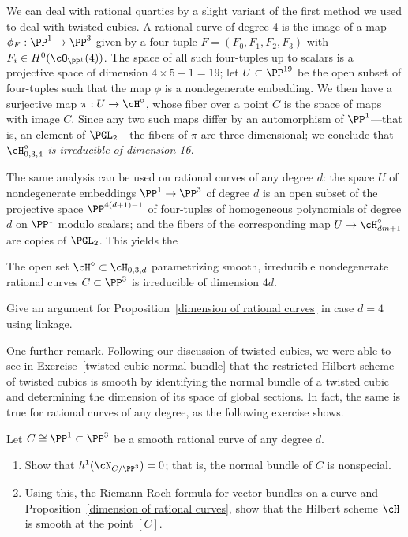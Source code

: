 We can deal with rational quartics by a slight variant of the first method we used to deal with twisted cubics. A rational curve of degree 4 is the image of a map $\phi_F : \PP^1 \to \PP^3$ given by a four-tuple $F = (F_0,F_1,F_2,F_3)$ with $F_i \in H^0(\cO_{\PP^1}(4))$. The space of all such four-tuples up to scalars is a projective space of dimension $4 \times 5 - 1 = 19$; let $U \subset \PP^{19}$ be the open subset of four-tuples such that the map $\phi$ is a nondegenerate embedding. We then have a surjective map $\pi : U \to \cH^\circ$, whose fiber over a point $C$ is the space of maps with image $C$. Since any two such maps differ by an automorphism of $\PP^1$---that is, an element of $\PGL_2$---the fibers of $\pi$ are three-dimensional; we conclude that \emph{$\cH^\circ_{0,3,4}$ is irreducible of dimension 16}.

The same analysis can be used on rational curves of any degree $d$: the space $U$ of nondegenerate embeddings $\PP^1 \to \PP^3$ of degree $d$ is an open subset of the projective space $\PP^{4(d+1)-1}$ of four-tuples of homogeneous polynomials of degree $d$ on $\PP^1$ modulo scalars; and the fibers of the corresponding map $U \to \cH^\circ_{dm+1}$ are copies of $\PGL_2$. This yields the

\begin{proposition}\label{dimension of rational curves}
The open set $\cH^\circ \subset \cH_{0,3,d}$ parametrizing smooth, irreducible nondegenerate rational curves $C \subset \PP^3$ is irreducible of dimension $4d$.
\end{proposition}

\begin{exercise}
Give an argument for Proposition~\ref{dimension of rational curves} in case $d=4$ using linkage. 
\end{exercise}

One further remark. Following our discussion of twisted cubics, we were able to see in Exercise~\ref{twisted cubic normal bundle} that the restricted Hilbert scheme of twisted cubics is smooth by identifying the normal bundle of a twisted cubic and determining the dimension of its space of global sections. In fact, the same is true for rational curves of any degree, as the following exercise shows.

\begin{exercise}
Let $C \cong \PP^1 \subset \PP^3$ be a smooth rational curve of any degree $d$. 
\begin{enumerate}
\item Show that $h^1(\cN_{C/\PP^3}) = 0$; that is, the normal bundle of $C$ is nonspecial.
\item Using this, the Riemann-Roch formula for vector bundles on a curve and Proposition~\ref{dimension of rational curves}, show that the Hilbert scheme $\cH$ is smooth at the point $[C]$.
\end{enumerate} 
\end{exercise}

